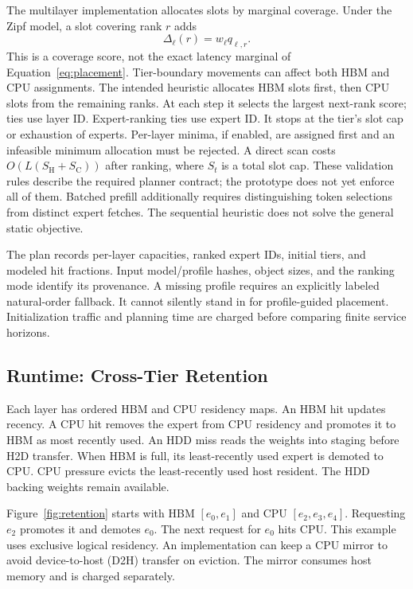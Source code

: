 \documentclass[conference,9pt,letterpaper]{IEEEtran}
\begin{document}
The multilayer implementation allocates slots by marginal coverage. Under the Zipf model, a slot covering rank $r$ adds
\begin{equation}
 \Delta_{\ell}(r)=w_\ell q_{\ell,r}.
\end{equation}
This is a coverage score, not the exact latency marginal of Equation~\ref{eq:placement}. Tier-boundary movements can affect both HBM and CPU assignments. The intended heuristic allocates HBM slots first, then CPU slots from the remaining ranks. At each step it selects the largest next-rank score; ties use layer ID. Expert-ranking ties use expert ID. It stops at the tier's slot cap or exhaustion of experts. Per-layer minima, if enabled, are assigned first and an infeasible minimum allocation must be rejected. A direct scan costs $O(L(S_{\mathrm H}+S_{\mathrm C}))$ after ranking, where $S_t$ is a total slot cap. These validation rules describe the required planner contract; the prototype does not yet enforce all of them. Batched prefill additionally requires distinguishing token selections from distinct expert fetches. The sequential heuristic does not solve the general static objective.

The plan records per-layer capacities, ranked expert IDs, initial tiers, and modeled hit fractions. Input model/profile hashes, object sizes, and the ranking mode identify its provenance. A missing profile requires an explicitly labeled natural-order fallback. It cannot silently stand in for profile-guided placement. Initialization traffic and planning time are charged before comparing finite service horizons.

\subsection{Runtime: Cross-Tier Retention}
Each layer has ordered HBM and CPU residency maps. An HBM hit updates recency. A CPU hit removes the expert from CPU residency and promotes it to HBM as most recently used. An HDD miss reads the weights into staging before H2D transfer. When HBM is full, its least-recently used expert is demoted to CPU. CPU pressure evicts the least-recently used host resident. The HDD backing weights remain available.

Figure~\ref{fig:retention} starts with HBM $[e_0,e_1]$ and CPU $[e_2,e_3,e_4]$. Requesting $e_2$ promotes it and demotes $e_0$. The next request for $e_0$ hits CPU. This example uses exclusive logical residency. An implementation can keep a CPU mirror to avoid device-to-host (D2H) transfer on eviction. The mirror consumes host memory and is charged separately.
\end{document}
